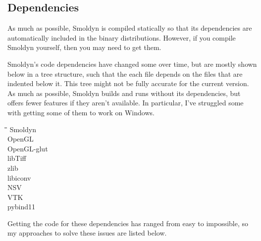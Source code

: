 \documentclass {book}
\begin{document}
\subsection{Dependencies}

As much as possible, Smoldyn is compiled statically so that its dependencies are automatically included in the binary distributions. However, if you compile Smoldyn yourself, then you may need to get them.

Smoldyn's code dependencies have changed some over time, but are mostly shown below in a tree structure, such that the each file depends on the files that are indented below it. This tree might not be fully accurate for the current version. As much as possible, Smoldyn builds and runs without its dependencies, but offers fewer features if they aren't available. In particular, I've struggled some with getting some of them to work on Windows.

\begin{tabbing}
\hspace{0.25in}\=\hspace{0.25in}\=\hspace{0.25in}\=\hspace{0.25in}\=\hspace{0.25in}\=\kill
\>Smoldyn\\
\>\>OpenGL\\
\>\>OpenGL-glut\\
\>\>libTiff\\
\>\>zlib\\
\>\>libiconv\\
\>\>NSV\\
\>\>\>VTK\\
\>\>pybind11\\
\end{tabbing}

Getting the code for these dependencies has ranged from easy to impossible, so my approaches to solve these issues are listed below.
\end{document}

